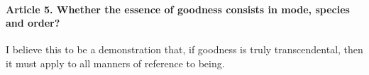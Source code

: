 \documentclass{ucetd}
\begin{document}
\paragraph{Article 5. Whether the essence of goodness consists in mode, species and order?}
I believe this to be a demonstration that, if goodness is truly transcendental, then it must apply to all manners of reference to being.
\end{document}
